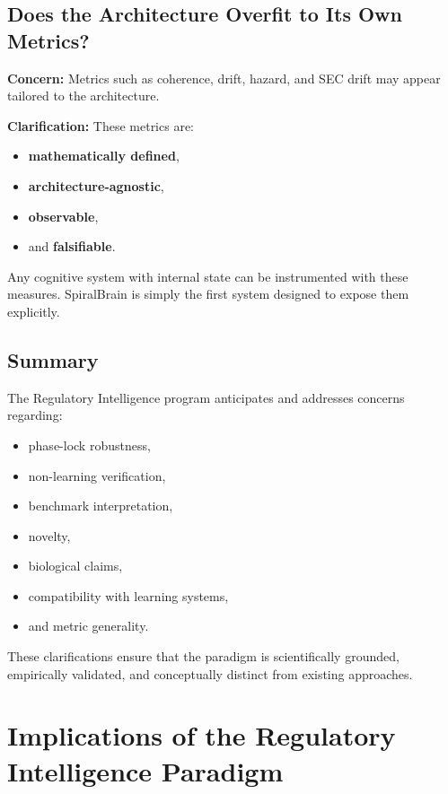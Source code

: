 \documentclass[12pt,a4paper]{report}
\begin{document}
\subsection{Does the Architecture Overfit to Its Own Metrics?}

\textbf{Concern:}  
Metrics such as coherence, drift, hazard, and SEC drift may appear tailored to the architecture.

\textbf{Clarification:}  
These metrics are:

\begin{itemize}
\item \textbf{mathematically defined},  
\item \textbf{architecture-agnostic},  
\item \textbf{observable},  
\item and \textbf{falsifiable}.
\end{itemize}

Any cognitive system with internal state can be instrumented with these measures. SpiralBrain \cite{SpiralBrainV3} is simply the first system designed to expose them explicitly.

\subsection{Summary}

The Regulatory Intelligence program anticipates and addresses concerns regarding:

\begin{itemize}
\item phase-lock robustness,  
\item non-learning verification,  
\item benchmark interpretation,  
\item novelty,  
\item biological claims,  
\item compatibility with learning systems,  
\item and metric generality.
\end{itemize}

These clarifications ensure that the paradigm is scientifically grounded, empirically validated, and conceptually distinct from existing approaches.

\section{Implications of the Regulatory Intelligence Paradigm}
\end{document}
